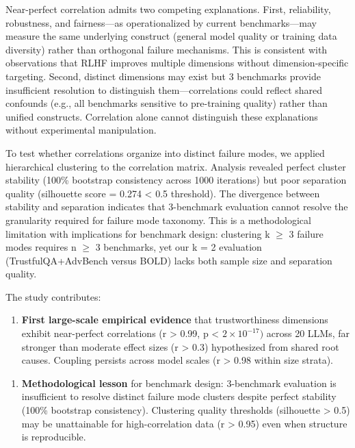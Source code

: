 Near-perfect correlation admits two competing explanations. First, reliability, robustness, and fairness---as operationalized by current benchmarks---may measure the same underlying construct (general model quality or training data diversity) rather than orthogonal failure mechanisms. This is consistent with observations that RLHF improves multiple dimensions without dimension-specific targeting. Second, distinct dimensions may exist but 3 benchmarks provide insufficient resolution to distinguish them---correlations could reflect shared confounds (e.g., all benchmarks sensitive to pre-training quality) rather than unified constructs. Correlation alone cannot distinguish these explanations without experimental manipulation.

To test whether correlations organize into distinct failure modes, we applied hierarchical clustering to the correlation matrix. Analysis revealed perfect cluster stability (100\% bootstrap consistency across 1000 iterations) but poor separation quality (silhouette score = 0.274 < 0.5 threshold). The divergence between stability and separation indicates that 3-benchmark evaluation cannot resolve the granularity required for failure mode taxonomy. This is a methodological limitation with implications for benchmark design: clustering k $\geq$ 3 failure modes requires n $\geq$ 3 benchmarks, yet our k = 2 evaluation (TrustfulQA+AdvBench versus BOLD) lacks both sample size and separation quality.

The study contributes:

\begin{enumerate}
\item \textbf{First large-scale empirical evidence} that trustworthiness dimensions exhibit near-perfect correlations (r > 0.99, p < $2\times 10^{-17})$ across 20 LLMs, far stronger than moderate effect sizes (r > 0.3) hypothesized from shared root causes. Coupling persists across model scales (r > 0.98 within size strata).
\end{enumerate}

\begin{enumerate}
\item \textbf{Methodological lesson} for benchmark design: 3-benchmark evaluation is insufficient to resolve distinct failure mode clusters despite perfect stability (100\% bootstrap consistency). Clustering quality thresholds (silhouette > 0.5) may be unattainable for high-correlation data (r > 0.95) even when structure is reproducible.
\end{enumerate}

